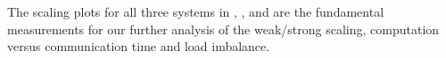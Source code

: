 \documentclass{sig-alternate}
\begin{document}
The scaling plots for all three
systems in , , and  are the fundamental
measurements for our further analysis of the weak/strong scaling, computation
versus communication time and load imbalance.
\begin{figure}
  \centering
\end{figure}
\end{document}
